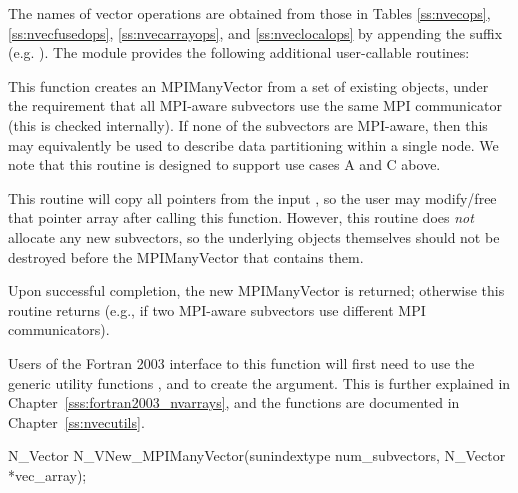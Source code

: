 The names of vector operations are obtained from those in Tables
\ref{ss:nvecops}, \ref{ss:nvecfusedops}, \ref{ss:nvecarrayops}, and
\ref{ss:nveclocalops} by appending the suffix 
(e.g. ).
The module {\nvecmpimanyvector} provides the following additional
user-callable routines:
{
  This function creates an MPIManyVector from a set of existing {\nvector}
  objects, under the requirement that all MPI-aware subvectors use the
  same MPI communicator (this is checked internally).  If none of the
  subvectors are MPI-aware, then this may equivalently be used to
  describe data partitioning within a single node.  We note that this
  routine is designed to support use cases A and C above.

  This routine will copy all  pointers from the input
  , so the user may modify/free that pointer array
  after calling this function.  However, this routine does \emph{not}
  allocate any new subvectors, so the underlying {\nvector} objects
  themselves should not be destroyed before the MPIManyVector that
  contains them.

  Upon successful completion, the new MPIManyVector is returned;
  otherwise this routine returns  (e.g., if two MPI-aware
  subvectors use different MPI communicators).

  Users of the Fortran 2003 interface to this function will first need
  to use the generic  utility functions
  , and  to create
  the  argument. This is further explained in
  Chapter~\ref{sss:fortran2003_nvarrays}, and the functions are documented
  in Chapter~\ref{ss:nvecutils}.
}
{
  N\_Vector N\_VNew\_MPIManyVector(sunindextype num\_subvectors,
  N\_Vector *vec\_array);
}
